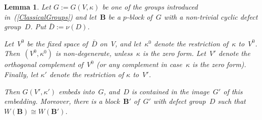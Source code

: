 \documentclass[12pt]{amsart}
\newcommand{\bB}{{\mathbf{B}}}
\newtheorem{lem}[thm]{Lemma}
\theoremstyle{theorem}
\theoremstyle{definition}
\theoremstyle{remark}
\begin{document}
\begin{lem}
\label{NoEigenvalueIs1}
Let $G := G( V, \kappa )$ be one of the groups introduced 
in~{\rm (\ref{ClassicalGroups})} and let~$\bB$ be a $p$-block of~$G$ with a 
non-trivial cyclic defect group~$D$. Put $\bar{D} := \nu( D )$.

Let~$V^0$ be the fixed space of~$\bar{D}$ on~$V$, and let~$\kappa^0$ denote 
the restriction of~$\kappa$ to~$V^0$. Then~$(V^0,\kappa^0)$ is non-degenerate,
unless~$\kappa$ is the zero form. Let~$V'$ denote the orthogonal complement 
of~$V^0$ (or any complement in case~$\kappa$ is the zero form). Finally, let 
$\kappa'$ denote the restriction of $\kappa$ to~$V'$.

Then $G( V', \kappa' )$ embeds into~$G$, and~$D$ is contained in the image~$G'$ 
of this embedding. Moreover, there is a block~$\bB'$ of~$G'$ with defect 
group~$D$ such that $W( \bB ) \cong W( \bB' )$.
\end{lem}
\end{document}
